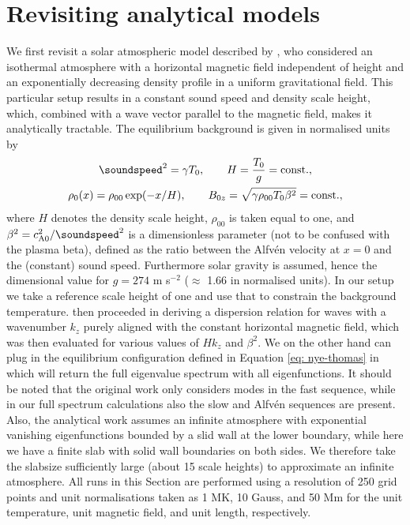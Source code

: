 \section{Revisiting analytical models} \label{sec: analytical_work}
We first revisit a solar atmospheric model described by \citet{nye1976}, who considered an isothermal atmosphere with a horizontal magnetic field independent of height and an exponentially decreasing density profile in a uniform gravitational field. This particular setup results in a constant sound speed and density scale height, which, combined with a wave vector parallel to the magnetic field, makes it analytically tractable. The equilibrium background is given in normalised units by
\begin{equation} \label{eq: nye-thomas}
  \begin{gathered}
    \soundspeed^2 = \gamma T_0,
    \qquad
    H = \frac{T_0}{g} = \text{const.}, \\
    \rho_0(x) = \rho_{00}\exp(-x/H),
    \qquad
    B_{0z} = \sqrt{\gamma \rho_{00}T_0 \beta^2} = \text{const.},
  \end{gathered}
\end{equation}
where $H$ denotes the density scale height, $\rho_{00}$ is taken equal to one, and $\beta^2 = c_\text{A0}^2/\soundspeed^2$ is a dimensionless parameter (not to be confused with the plasma beta), defined as the ratio between the Alfv\'en velocity at $x = 0$ and the (constant) sound speed. Furthermore solar gravity is assumed, hence the dimensional value for $g = 274$ m s$^{-2}$ ($\approx$ 1.66 in normalised units). In our setup we take a reference scale height of one and use that to constrain the background temperature. \citet{nye1976} then proceeded in deriving a dispersion relation for waves with a wavenumber $k_z$ purely aligned with the constant horizontal magnetic field, which was then evaluated for various values of $Hk_z$ and $\beta^2$. We on the other hand can plug in the equilibrium configuration defined in Equation \eqref{eq: nye-thomas} in {\legolas} which will return the full eigenvalue spectrum with all eigenfunctions. It should be noted that the original work only considers modes in the fast sequence, while in our full spectrum calculations also the slow and Alfv\'en sequences are present. Also, the analytical work assumes an infinite atmosphere with exponential vanishing eigenfunctions bounded by a slid wall at the lower boundary, while here we have a finite slab with solid wall boundaries on both sides. We therefore take the slabsize sufficiently large (about 15 scale heights) to approximate an infinite atmosphere. All runs in this Section are performed using a resolution of 250 grid points and unit normalisations taken as 1 MK, 10 Gauss, and 50 Mm for the unit temperature, unit magnetic field, and unit length, respectively.


